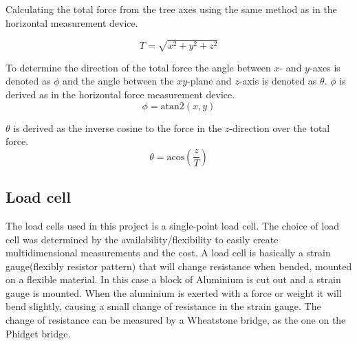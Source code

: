 \noindent
Calculating the total force from the tree axes using the same method as in the horizontal measurement device.

\begin{equation}
T = \sqrt{x^2+y^2+z^2}
\end{equation} 

\noindent
To determine the direction of the total force the angle between $x$- and $y$-axes is denoted as $\phi$ and the angle between the $xy$-plane and $z$-axis is denoted as $\theta$.
$\phi$ is derived as in the horizontal force measurement device.
\begin{equation}
\phi = \mathrm{atan2}(x,y)
\end{equation}

\noindent
$\theta$ is derived as the inverse cosine to the force in the $z$-direction over the total force.
\begin{equation}
\theta = \mathrm{acos}\left( \frac{z}{T} \right)
\end{equation}

\subsection{Load cell}
The load cells used in this project is a single-point load cell. The choice of load cell was determined by the availability/flexibility to easily create multidimensional measurements and the cost. A load cell is basically a strain gauge(flexibly resistor pattern) that will change resistance when bended, mounted on a flexible material. In this case a block of Aluminium is cut out and a strain gauge is mounted. When the aluminium is exerted with a force or weight it will bend slightly, causing a small change of resistance in the strain gauge. The change of resistance can be measured by a Wheatstone bridge, as the one on the Phidget bridge. 

